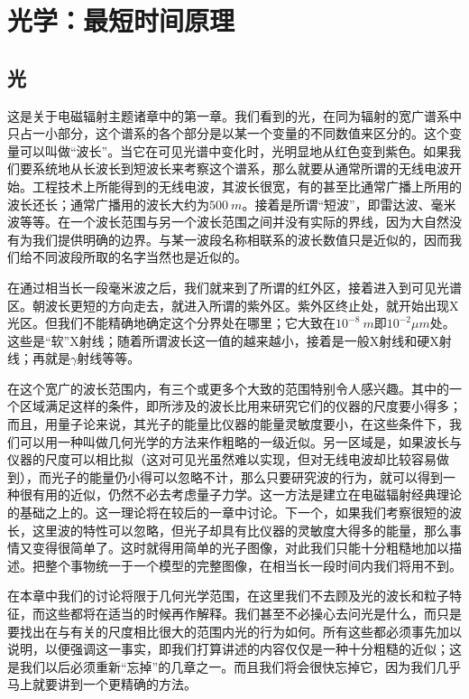\chapter{光学：最短时间原理}

\section{光}

这是关于电磁辐射主题诸章中的第一章。我们看到的光，在同为辐射的宽广谱系中只占一小部分，这个谱系的各个部分是以某一个变量的不同数值来区分的。这个变量可以叫做“波长”。当它在可见光谱中变化时，光明显地从红色变到紫色。如果我们要系统地从长波长到短波长来考察这个谱系，那么就要从通常所谓的无线电波开始。工程技术上所能得到的无线电波，其波长很宽，有的甚至比通常广播上所用的波长还长；通常广播用的波长大约为$500~m$。接着是所谓“短波”，即雷达波、毫米波等等。在一个波长范围与另一个波长范围之间并没有实际的界线，因为大自然没有为我们提供明确的边界。与某一波段名称相联系的波长数值只是近似的，因而我们给不同波段所取的名字当然也是近似的。

在通过相当长一段毫米波之后，我们就来到了所谓的红外区，接着进入到可见光谱区。朝波长更短的方向走去，就进入所谓的紫外区。紫外区终止处，就开始出现X光区。但我们不能精确地确定这个分界处在哪里；它大致在$10^{-8}~m$即$10^{-2}\mu m$处。这些是“软”X射线；随着所谓波长这一值的越来越小，接着是一般X射线和硬X射线；再就是$\gamma$射线等等。

在这个宽广的波长范围内，有三个或更多个大致的范围特别令人感兴趣。其中的一个区域满足这样的条件，即所涉及的波长比用来研究它们的仪器的尺度要小得多；而且，用量子论来说，其光子的能量比仪器的能量灵敏度要小，在这些条件下，我们可以用一种叫做几何光学的方法来作粗略的一级近似。另一区域是，如果波长与仪器的尺度可以相比拟（这对可见光虽然难以实现，但对无线电波却比较容易做到），而光子的能量仍小得可以忽略不计，那么只要研究波的行为，就可以得到一种很有用的近似，仍然不必去考虑量子力学。这一方法是建立在电磁辐射经典理论的基础之上的。这一理论将在较后的一章中讨论。下一个，如果我们考察很短的波长，这里波的特性可以忽略，但光子却具有比仪器的灵敏度大得多的能量，那么事情又变得很简单了。这时就得用简单的光子图像，对此我们只能十分粗糙地加以描述。把整个事物统一于一个模型的完整图像，在相当长一段时间内我们将用不到。

在本章中我们的讨论将限于几何光学范围，在这里我们不去顾及光的波长和粒子特征，而这些都将在适当的时候再作解释。我们甚至不必操心去问光是什么，而只是要找出在与有关的尺度相比很大的范围内光的行为如何。所有这些都必须事先加以说明，以便强调这一事实，即我们打算讲述的内容仅仅是一种十分粗糙的近似；这是我们以后必须重新“忘掉”的几章之一。而且我们将会很快忘掉它，因为我们几乎马上就要讲到一个更精确的方法。

